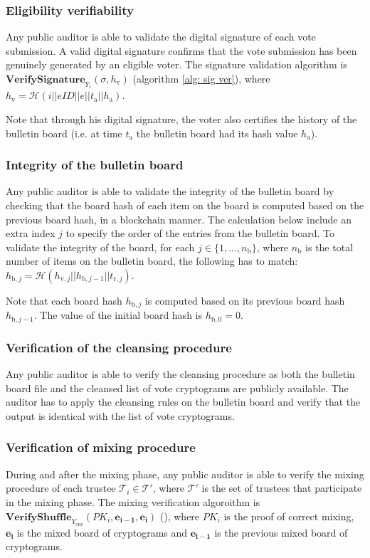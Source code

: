  
\subsubsection{Eligibility verifiability}
Any public auditor is able to validate the digital signature of each vote submission. A valid digital signature confirms that the vote submission has been genuinely generated by an eligible voter. The signature validation algorithm is \( \mathbf{VerifySignature}_{Y_i} (\sigma, h_\mathrm{v}) \) (algorithm \ref{alg: sig ver}), where \( h_\mathrm{v} = \mathcal{H}( i || eID || e || t_\mathrm{a} || h_\mathrm{a}) \).

Note that through his digital signature, the voter also certifies the history of the bulletin board (i.e. at time $t_\mathrm{a}$ the bulletin board had its hash value $h_\mathrm{a}$).


\subsubsection{Integrity of the bulletin board}
Any public auditor is able to validate the integrity of the bulletin board by checking that the board hash of each item on the board is computed based on the previous board hash, in a blockchain manner. The calculation below include an extra index $j$ to specify the order of the entries from the bulletin board. To validate the integrity of the board, for each \( j \in \{ 1, ..., n_\mathrm{b} \} \), where $n_\mathrm{b}$ is the total number of items on the bulletin board, the following has to match: \( h_{\mathrm{b},j} = \mathcal{H}(h_{\mathrm{v},j} || h_{\mathrm{b},j-1} || t_{\mathrm{r},j}) \).

Note that each board hash $h_{\mathrm{b},j}$ is computed based on its previous board hash $h_{\mathrm{b},j-1}$. The value of the initial board hash is \( h_{\mathrm{b},0} = 0 \).


\subsubsection{Verification of the cleansing procedure}
Any public auditor is able to verify the cleansing procedure as both the bulletin board file and the cleansed list of vote cryptograms are publicly available. The auditor has to apply the cleansing rules on the bulletin board and verify that the output is identical with the list of vote cryptograms.


\subsubsection{Verification of mixing procedure}
During and after the mixing phase, any public auditor is able to verify the mixing procedure of each trustee $\mathcal{T}_i \in \boldsymbol{\mathcal{T}'}$, where $\boldsymbol{\mathcal{T}'}$ is the set of trustees that participate in the mixing phase. The mixing verification algoroithm is \( \mathbf{VerifyShuffle}_{Y_\mathrm{enc}} (PK_i, \boldsymbol{e_{i-1}}, \boldsymbol{e_i}) \) (), where $PK_i$ is the proof of correct mixing, $\boldsymbol{e_i}$ is the mixed board of cryptograms and $\boldsymbol{e_{i-1}}$ is the previous mixed board of cryptograms.


